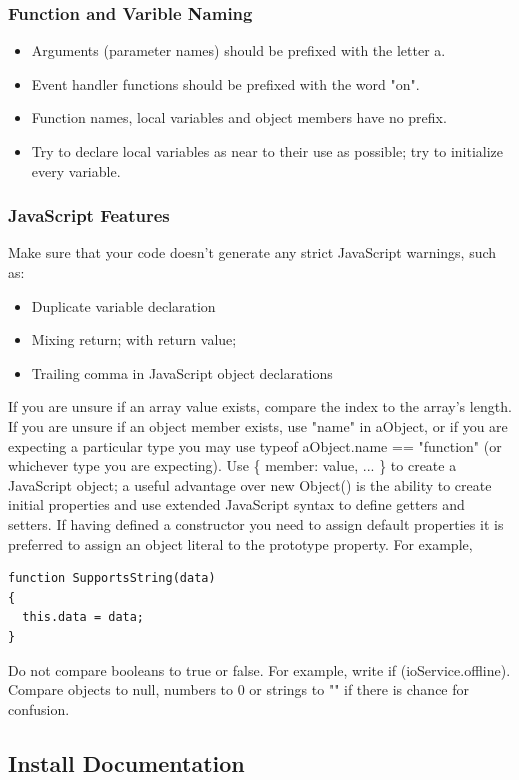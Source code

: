 \documentclass[letterpaper,12pt]{article}
\begin{document}
\subsubsection{Function and Varible Naming}
\begin{itemize}
\item Arguments (parameter names) should be prefixed with the letter a.
\item Event handler functions should be prefixed with the word "on".
\item Function names, local variables and object members have no prefix.
\item Try to declare local variables as near to their use as possible; try to initialize every variable.
\end{itemize}

\subsubsection{JavaScript Features}
Make sure that your code doesn't generate any strict JavaScript warnings, such as:
\begin{itemize}
      	  \item{Duplicate variable declaration}
      	  \item{Mixing return; with return value;}
      	  \item{Trailing comma in JavaScript object declarations}
\end{itemize}    	
If you are unsure if an array value exists, compare the index to the array's length. If you are unsure if an object member exists, use "name" in aObject, or if you are expecting a particular type you may use typeof aObject.name == "function" (or whichever type you are expecting).
Use \{ member: value, ... \} to create a JavaScript object; a useful advantage over new Object() is the ability to create initial properties and use extended JavaScript syntax to define getters and setters.  If having defined a constructor you need to assign default properties it is preferred to assign an object literal to the prototype property. For example,

\begin{verbatim}
function SupportsString(data)
{
  this.data = data;
}
\end{verbatim}
Do not compare booleans to true or false. For example, write if (ioService.offline). Compare objects to null, numbers to 0 or strings to "" if there is chance for confusion.

\subsection{Install Documentation}
\end{document}
